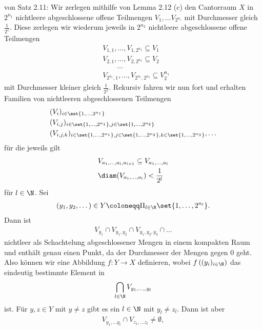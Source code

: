 \begin{beweis} von Satz 2.11: Wir zerlegen mithilfe von Lemma 2.12 (c) den Cantorraum $X$ in $2^{n_1}$ nichtleere abgeschlossene offene Teilmengen $V_1, \dots V_{2^{n_1}}$ mit Durchmesser gleich $\frac 1 {2^1}$. Diese zerlegen wir wiederum jeweils in $2^{n_2}$ nichtleere abgeschlossene offene Teilmengen 
  \begin{align*}
    &V_{1, 1}, \dots, V_{1, 2^{n_2}} \subseteq V_1\\
    &V_{2, 1}, \dots, V_{2, 2^{n_2}} \subseteq V_2\\
    &\qquad\dots\\
    &V_{2^{n_1}, 1}, \dots, V_{2^{n_1}, 2^{n_2}} \subseteq V_2^{n_1}
  \end{align*}
mit Durchmesser kleiner gleich $\frac 1 {2^2}$. Rekursiv fahren wir nun fort und erhalten Familien von nichtleeren abgeschlossenen Teilmengen 
\begin{align*}
  &(V_i)_{i \in \set{1, \dots , 2^{n_1}}}\\
  &(V_{i,j})_{i \in \set{1, \dots , 2^{n_1}}, j \in \set{1, \dots, 2^{n_2}}}\\
  &(V_{i,j, k})_{i \in \set{1, \dots , 2^{n_1}}, j \in \set{1, \dots, 2^{n_2}}, k \in \set{1, \dots, 2^{n_3}}}, \dots
\end{align*}
für die jeweils gilt
\begin{align*}
  &V_{a_1, \dots, a_l, a_{l+1}} \subseteq V_{a_1, \dots, a_l}\\
  &\diam(V_{a_1, \dots, a_l}) < \frac 1 {2^l}
\end{align*}
für $l \in \N$. Sei 
\begin{align*}
  (y_1, y_2, \dots) \in Y \coloneqq \Pi_{l \in \N} \set{1, \dots, 2^{n_l}}.
\end{align*} 
Dann ist 
\begin{align*}
  V_{y_1} \cap   V_{y_1, y_2} \cap   V_{y_1, y_2, y_3}  \cap \dots
\end{align*}
nichtleer als Schachtelung abgeschlossener Mengen in einem kompakten Raum und enthält genau einen Punkt, da der Durchmesser der Mengen gegen $0$ geht. Also können wir eine Abbildung $f: Y \to X$ definieren, wobei $f\left((y_i)_{i \in \N}\right)$ das eindeutig bestimmte Element in 
\begin{align*}
  \bigcap_{l \in \N} V_{y_1, \dots, ,y_l} 
\end{align*}
ist. Für $y, z \in Y$ mit $y \neq z$ gibt es ein $l \in \N$ mit $y_l \neq z_l$. Dann ist aber 
\begin{align*}
  V_{y_1, \dots y_l} \cap V_{z_1, \dots z_l} \neq \emptyset,

\end{align*}
\end{beweis}
